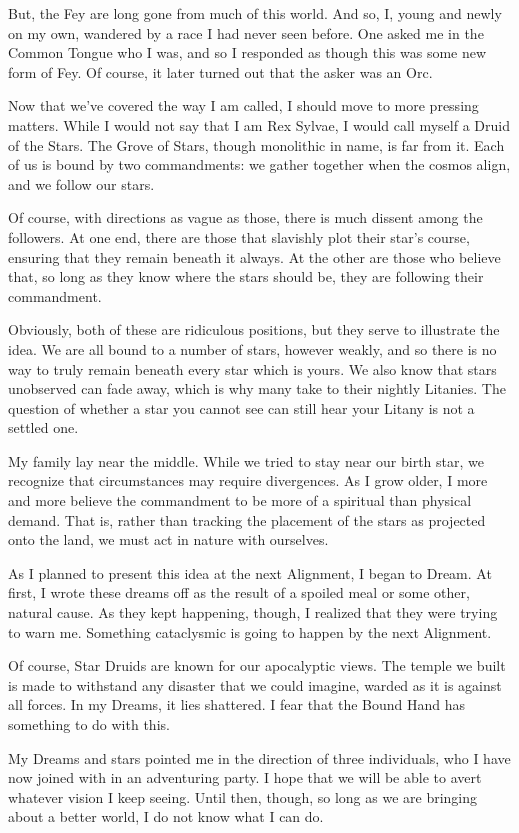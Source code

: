 \documentclass[12pt]{article}[titlepage]
\renewcommand{\,}{\textsuperscript{,}}
\begin{document}
But, the Fey are long gone from much of this world.
And so, I, young and newly on my own, wandered by a race I had never seen before.
One asked me in the Common Tongue who I was, and so I responded as though this was some new form of Fey.
Of course, it later turned out that the asker was an Orc.

Now that we've covered the way I am called, I should move to more pressing matters.
While I would not say that I am Rex Sylvae, I would call myself a Druid of the Stars.
The Grove of Stars, though monolithic in name, is far from it.
Each of us is bound by two commandments: we gather together when the cosmos align, and we follow our stars.

Of course, with directions as vague as those, there is much dissent among the followers.
At one end, there are those that slavishly plot their star's course, ensuring that they remain beneath it always.
At the other are those who believe that, so long as they know where the stars should be, they are following their commandment.

Obviously, both of these are ridiculous positions, but they serve to illustrate the idea.
We are all bound to a number of stars, however weakly, and so there is no way to truly remain beneath every star which is yours.
We also know that stars unobserved can fade away, which is why many take to their nightly Litanies.
The question of whether a star you cannot see can still hear your Litany is not a settled one.

My family lay near the middle.
While we tried to stay near our birth star, we recognize that circumstances may require divergences.
As I grow older, I more and more believe the commandment to be more of a spiritual than physical demand.
That is, rather than tracking the placement of the stars as projected onto the land, we must act in nature with ourselves.

As I planned to present this idea at the next Alignment, I began to Dream.
At first, I wrote these dreams off as the result of a spoiled meal or some other, natural cause.
As they kept happening, though, I realized that they were trying to warn me.
Something cataclysmic is going to happen by the next Alignment.

Of course, Star Druids are known for our apocalyptic views.
The temple we built is made to withstand any disaster that we could imagine, warded as it is against all forces.
In my Dreams, it lies shattered.
I fear that the Bound Hand has something to do with this.

My Dreams and stars pointed me in the direction of three individuals, who I have now joined with in an adventuring party.
I hope that we will be able to avert whatever vision I keep seeing.
Until then, though, so long as we are bringing about a better world, I do not know what I can do.
\end{document}
